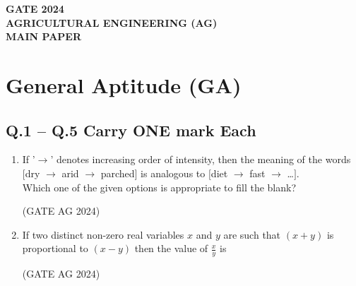 \documentclass[journal]{IEEEtran}
\begin{document}



\begin{center}
    \textbf{\Large GATE 2024\\
    AGRICULTURAL ENGINEERING (AG)\\
    MAIN PAPER}
\end{center}

\section*{General Aptitude (GA)}
\subsection*{Q.1 -- Q.5 Carry ONE mark Each}

\begin{enumerate}
 \item
If '$\rightarrow$' denotes increasing order of intensity, then the meaning of the words\\
$[$dry $\rightarrow$ arid $\rightarrow$ parched$]$ is analogous to $[$diet $\rightarrow$ fast $\rightarrow$ \dots $]$.\\
 Which one of the given options is appropriate to fill the blank?
    
 \begin{enumerate}
    \end{enumerate}
    \hfill(GATE AG 2024)\\

    \medskip

\item
If two distinct non-zero real variables $x$ and $y$ are such that $(x+y)$ is proportional to $(x-y)$ then the value of $\frac{x}{y}$ is
    \begin{enumerate}
    \end{enumerate}
     \hfill(GATE AG 2024)\\


\end{enumerate}
\end{document}

